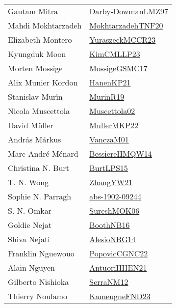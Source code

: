 {\begin{longtable}{p{4cm}p{20cm}}
Gautam Mitra & \href{articles/Darby-DowmanLMZ97.pdf}{Darby-DowmanLMZ97}\cite{Darby-DowmanLMZ97} \\
Mahdi Mokhtarzadeh & \href{articles/MokhtarzadehTNF20.pdf}{MokhtarzadehTNF20}\cite{MokhtarzadehTNF20} \\
Elizabeth Montero & \href{articles/YuraszeckMCCR23.pdf}{YuraszeckMCCR23}\cite{YuraszeckMCCR23} \\
Kyungduk Moon & \href{papers/KimCMLLP23.pdf}{KimCMLLP23}\cite{KimCMLLP23} \\
Morten Mossige & \href{papers/MossigeGSMC17.pdf}{MossigeGSMC17}\cite{MossigeGSMC17} \\
Alix Munier Kordon & \href{papers/HanenKP21.pdf}{HanenKP21}\cite{HanenKP21} \\
Stanislav Mur{\'{\i}}n & \href{papers/MurinR19.pdf}{MurinR19}\cite{MurinR19} \\
Nicola Muscettola & \href{papers/Muscettola02.pdf}{Muscettola02}\cite{Muscettola02} \\
David M{\"{u}}ller & \href{articles/MullerMKP22.pdf}{MullerMKP22}\cite{MullerMKP22} \\
Andr{\'{a}}s M{\'{a}}rkus & \href{papers/VanczaM01.pdf}{VanczaM01}\cite{VanczaM01} \\
Marc{-}Andr{\'{e}} M{\'{e}}nard & \href{papers/BessiereHMQW14.pdf}{BessiereHMQW14}\cite{BessiereHMQW14} \\
Christina N. Burt & \href{papers/BurtLPS15.pdf}{BurtLPS15}\cite{BurtLPS15} \\
T. N. Wong & \href{articles/ZhangYW21.pdf}{ZhangYW21}\cite{ZhangYW21} \\
Sophie N. Parragh & \href{articles/abs-1902-09244.pdf}{abs-1902-09244}\cite{abs-1902-09244} \\
S. N. Omkar & \href{articles/SureshMOK06.pdf}{SureshMOK06}\cite{SureshMOK06} \\
Goldie Nejat & \href{papers/BoothNB16.pdf}{BoothNB16}\cite{BoothNB16} \\
Shiva Nejati & \href{papers/AlesioNBG14.pdf}{AlesioNBG14}\cite{AlesioNBG14} \\
Franklin Nguewouo & \href{papers/PopovicCGNC22.pdf}{PopovicCGNC22}\cite{PopovicCGNC22} \\
Alain Nguyen & \href{papers/AntuoriHHEN21.pdf}{AntuoriHHEN21}\cite{AntuoriHHEN21} \\
Gilberto Nishioka & \href{papers/SerraNM12.pdf}{SerraNM12}\cite{SerraNM12} \\
Thierry Noulamo & \href{papers/KameugneFND23.pdf}{KameugneFND23}\cite{KameugneFND23} \\

\end{longtable}}
